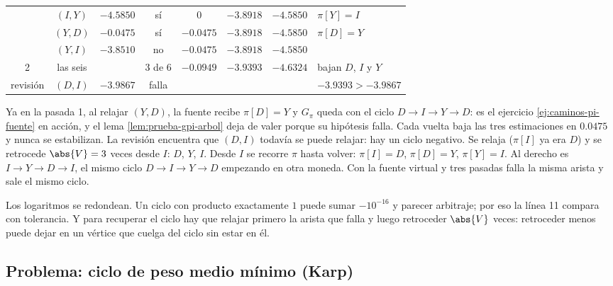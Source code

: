 \documentclass[11pt,letterpaper]{article}
\begin{document}
\begin{ejemplo}
\begin{center}
\begin{tabular}{cccccccl}
      & $(I, Y)$ & $-4.5850$ & sí & $0$ & $-3.8918$ & $-4.5850$
      & $\pi[Y] = I$ \\
      & $(Y, D)$ & $-0.0475$ & sí & $-0.0475$ & $-3.8918$
      & $-4.5850$ & $\pi[D] = Y$ \\
      & $(Y, I)$ & $-3.8510$ & no & $-0.0475$ & $-3.8918$
      & $-4.5850$ & \\
    \midrule
    2 & las seis & & 3 de 6 & $-0.0949$ & $-3.9393$ & $-4.6324$
      & bajan $D$, $I$ y $Y$ \\
    \midrule
    revisión & $(D, I)$ & $-3.9867$ & falla & & & &
      $-3.9393 > -3.9867$ \\
    \bottomrule
  \end{tabular}
  \end{center}
  Ya en la pasada 1, al relajar $(Y, D)$, la fuente recibe
  $\pi[D] = Y$ y $G_\pi$ queda con el ciclo $D \to I \to Y \to D$: es
  el ejercicio \ref{ej:caminos-pi-fuente} en acción, y el lema
  \ref{lem:prueba-gpi-arbol} deja de valer porque su hipótesis falla.
  Cada vuelta baja las tres estimaciones en $0.0475$ y nunca se
  estabilizan. La revisión encuentra que $(D, I)$ todavía se puede
  relajar: hay un ciclo negativo. Se relaja ($\pi[I]$ ya era $D$) y se
  retrocede $\abs{V} = 3$ veces desde $I$: $D$, $Y$, $I$. Desde $I$ se
  recorre $\pi$ hasta volver: $\pi[I] = D$, $\pi[D] = Y$,
  $\pi[Y] = I$. Al derecho es $I \to Y \to D \to I$, el mismo ciclo
  $D \to I \to Y \to D$ empezando en otra moneda. Con la fuente
  virtual y tres pasadas falla la misma arista y sale el mismo ciclo.
\end{ejemplo}

\begin{ojo}
  Los logaritmos se redondean. Un ciclo con producto exactamente $1$
  puede sumar $-10^{-16}$ y parecer arbitraje; por eso la línea 11
  compara con tolerancia. Y para recuperar el ciclo hay que relajar
  primero la arista que falla y luego retroceder $\abs{V}$ veces:
  retroceder menos puede dejar en un vértice que cuelga del ciclo sin
  estar en él.
\end{ojo}


\subsection*{Problema: ciclo de peso medio mínimo (Karp)}
\end{document}
